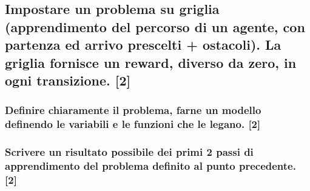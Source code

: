 \documentclass[\main/main.tex]{subfiles}
\begin{document}
\subsection{Impostare un problema su griglia (apprendimento del percorso di un agente, con partenza ed arrivo prescelti + ostacoli). La griglia fornisce un reward, diverso da zero, in ogni transizione. [2]}
\subsubsection{Definire chiaramente il problema, farne un modello definendo le variabili e le funzioni che le legano. [2]}
\subsubsection{Scrivere un risultato possibile dei primi 2 passi di apprendimento del problema definito al punto precedente. [2]}
\end{document}
